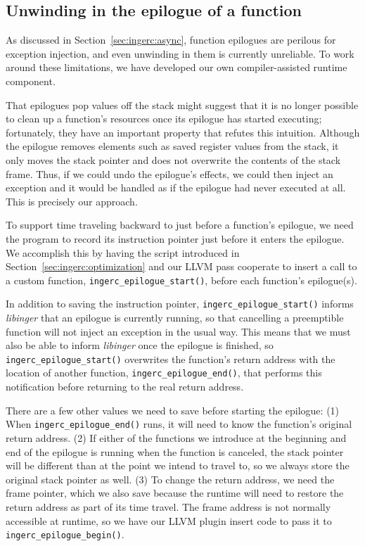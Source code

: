\subsection{Unwinding in the epilogue of a function}

As discussed in Section~\ref{sec:ingerc:async}, function epilogues are perilous for
exception injection, and even unwinding in them is currently unreliable.  To work
around these limitations, we have developed our own compiler-assisted runtime
component.

That epilogues pop values off the stack might suggest that it is no longer possible
to clean up a function's resources once its epilogue has started executing;
fortunately, they have an important property that refutes this intuition.  Although
the epilogue removes elements such as saved register values from the stack, it only
moves the stack pointer and does not overwrite the contents of the stack frame.
Thus, if we could undo the epilogue's effects, we could then inject an exception and
it would be handled as if the epilogue had never executed at all.  This is precisely
our approach.

To support time traveling backward to just before a function's epilogue, we need the
program to record its instruction pointer just before it enters the epilogue.  We
accomplish this by having the script introduced in
Section~\ref{sec:ingerc:optimization} and our LLVM pass cooperate to insert a call to
a custom function, \texttt{ingerc\_epilogue\_start()}, before each function's
epilogue(s).

In addition to saving the instruction pointer, \texttt{ingerc\_epilogue\_start()}
informs \textit{libinger} that an epilogue is currently running, so that cancelling a
preemptible function will not inject an exception in the usual way.  This means that
we must also be able to inform \textit{libinger} once the epilogue is finished, so
\texttt{ingerc\_epilogue\_start()} overwrites the function's return address with the
location of another function, \texttt{ingerc\_epilogue\_end()}, that performs this
notification before returning to the real return address.

There are a few other values we need to save before starting the epilogue:  (1) When
\texttt{ingerc\_epilogue\_end()} runs, it will need to know the function's original
return address.  (2) If either of the functions we introduce at the beginning and end
of the epilogue is running when the function is canceled, the stack pointer will be
different than at the point we intend to travel to, so we always store the original
stack pointer as well.  (3) To change the return address, we need the frame pointer,
which we also save because the runtime will need to restore the return address as
part of its time travel.  The frame address is not normally accessible at runtime, so
we have our LLVM plugin insert code to pass it to \texttt{ingerc\_epilogue\_begin()}.


